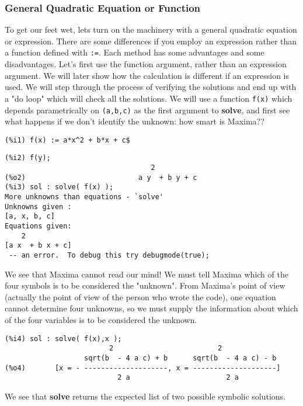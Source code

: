 \documentclass[12pt]{article}
\begin{document}
\subsubsection{General Quadratic Equation or Function}
To get our feet wet, lets turn on the machinery with a general quadratic equation 
  or expression.
 There are some differences if you employ an expression rather than a function
   defined with \verb|:=|.
Each method has some advantages and some disadvantages.
Let's first use the function argument, rather than an expression argument.
We will later show how the calculation is different if an expression is used.
We will step through the process of verifying the solutions and end up with
  a "do loop" which will check all the solutions. We will use a function \verb|f(x)|
  which depends parametrically on \verb|(a,b,c)| as the first argument to \textbf{solve}, and
  first see what happens if we don't identify the unknown: how smart is Maxima??
\small
\begin{verbatim} 
(%i1) f(x) := a*x^2 + b*x + c$
\end{verbatim}
\newpage
\begin{verbatim}
(%i2) f(y);
                                   2
(%o2)                           a y  + b y + c
(%i3) sol : solve( f(x) );
More unknowns than equations - `solve'
Unknowns given :  
[a, x, b, c]
Equations given:  
    2
[a x  + b x + c]
 -- an error.  To debug this try debugmode(true);
\end{verbatim}
\normalsize
We see that Maxima cannot read our mind! We must tell Maxima which of the four symbols is
  to be considered the "unknown". From Maxima's point of view (actually the point of view
  of the person who wrote the code), one equation cannot determine four unknowns, so we must
  supply the information about which of the four variables is to be considered the unknown.
\small
\begin{verbatim}
(%i4) sol : solve( f(x),x );
                         2                         2
                   sqrt(b  - 4 a c) + b      sqrt(b  - 4 a c) - b
(%o4)       [x = - --------------------, x = --------------------]
                           2 a                       2 a
\end{verbatim}
\normalsize
We see that \textbf{solve} returns the expected list of two possible symbolic solutions.
\end{document}

